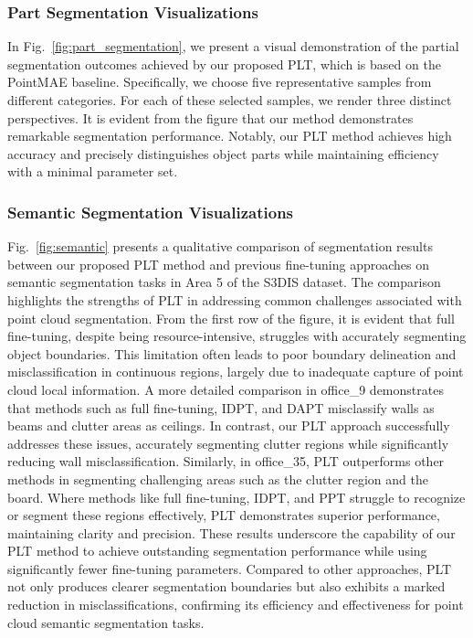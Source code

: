 \subsubsection{Part Segmentation Visualizations}

In Fig.~\ref{fig:part_segmentation}, we present a visual demonstration of the partial segmentation outcomes achieved by our proposed PLT, which is based on the PointMAE baseline. Specifically, we choose five representative samples from different categories. For each of these selected samples, we render three distinct perspectives. It is evident from the figure that our method demonstrates remarkable segmentation performance. Notably, our PLT method achieves high accuracy and precisely distinguishes object parts while maintaining efficiency with a minimal parameter set.

\subsubsection{Semantic Segmentation Visualizations}

Fig.~\ref{fig:semantic} presents a qualitative comparison of segmentation results between our proposed PLT method and previous fine-tuning approaches on semantic segmentation tasks in Area 5 of the S3DIS dataset. The comparison highlights the strengths of PLT in addressing common challenges associated with point cloud segmentation. From the first row of the figure, it is evident that full fine-tuning, despite being resource-intensive, struggles with accurately segmenting object boundaries. This limitation often leads to poor boundary delineation and misclassification in continuous regions, largely due to inadequate capture of point cloud local information. A more detailed comparison in office\_9 demonstrates that methods such as full fine-tuning, IDPT, and DAPT misclassify walls as beams and clutter areas as ceilings. In contrast, our PLT approach successfully addresses these issues, accurately segmenting clutter regions while significantly reducing wall misclassification. Similarly, in office\_35, PLT outperforms other methods in segmenting challenging areas such as the clutter region and the board. Where methods like full fine-tuning, IDPT, and PPT struggle to recognize or segment these regions effectively, PLT demonstrates superior performance, maintaining clarity and precision. These results underscore the capability of our PLT method to achieve outstanding segmentation performance while using significantly fewer fine-tuning parameters. Compared to other approaches, PLT not only produces clearer segmentation boundaries but also exhibits a marked reduction in misclassifications, confirming its efficiency and effectiveness for point cloud semantic segmentation tasks.












